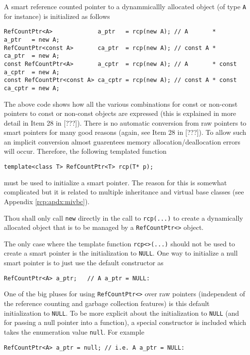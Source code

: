 A smart reference counted pointer to a dynammicallly allocated object
(of type \texttt{A} for instance) is initialized as follows
%
{\scriptsize\begin{verbatim}
RefCountPtr<A>             a_ptr   = rcp(new A); // A       *       a_ptr   = new A;
RefCountPtr<const A>       ca_ptr  = rcp(new A); // const A *       ca_ptr  = new A;
const RefCountPtr<A>       a_cptr  = rcp(new A); // A       * const a_cptr  = new A;
const RefCountPtr<const A> ca_cptr = rcp(new A); // const A * const ca_cptr = new A;
\end{verbatim}}
%
The above code shows how all the various combinations for const or
non-const pointers to const or non-const objects are expressed (this
is explained in more detail in Item 28 in [???]).  There is no
automatic conversion from raw pointers to smart pointers for many good
reasons (again, see Item 28 in [???]).  To allow such an implicit
conversion almost guarentees memory allocation/deallocation errors
will occur.  Therefore, the following templated function
%
{\scriptsize\begin{verbatim}
template<class T> RefCountPtr<T> rcp(T* p);
\end{verbatim}}
%
\noindent{}must be used to initialize a smart pointer.
The reason for this is somewhat complicated but it is related to
multiple inheritance and virtual base classes (see Appendix
\ref{rcp:apdx:mivbc}).

\begin{commandment}\label{rcp:cmd:rcp-new}
Thou shall only call \texttt{new} directly
in the call to \texttt{rcp(...)} to create a dynamically allocated
object that is to be managed by a \texttt{RefCountPtr<>} object.
\end{commandment}

The only case where the template function \texttt{rcp<>(...)} should
not be used to create a smart pointer is the initialization to
\texttt{NULL}.  One way to initialize a null smart pointer is to just
use the default constructor as
%
{\scriptsize\begin{verbatim}
RefCountPtr<A> a_ptr;   // A a_ptr = NULL:
\end{verbatim}}
%
One of the big pluses for using \texttt{RefCountPtr<>} over raw
pointers (independent of the reference counting and garbage collection
features) is this default initialization to \texttt{NULL}.
To be more explicit about the initialization to \texttt{NULL} (and for
passing a null pointer into a function), a special constructor is
included which takes the enumeration value \texttt{null}.  For example
%
{\scriptsize\begin{verbatim}
RefCountPtr<A> a_ptr = null; // i.e. A a_ptr = NULL:
\end{verbatim}}
%

